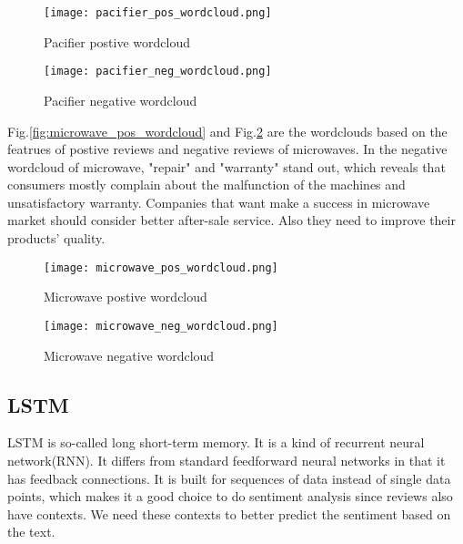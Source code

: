 \documentclass{mcmthesis}
\begin{document}
\begin{figure}[!h]
\centering
\begin{minipage}[t]{0.48\textwidth}
\centering
\texttt{[image: pacifier\_pos\_wordcloud.png]}
\caption{Pacifier postive wordcloud}
\label{fig:pacifier_pos_wordcloud}
\end{minipage}
\begin{minipage}[t]{0.48\textwidth}
\centering
\texttt{[image: pacifier\_neg\_wordcloud.png]}
\caption{Pacifier negative wordcloud}
\label{fig:pacifier_neg_wordcloud}
\end{minipage}
\end{figure}



Fig.\ref{fig:microwave_pos_wordcloud} and Fig.\ref{fig:microwave_neg_wordcloud} are the wordclouds based on the featrues of postive reviews and negative reviews of microwaves. In the negative wordcloud of microwave, "repair" and "warranty" stand out, which reveals that consumers mostly complain about the malfunction of the machines and unsatisfactory warranty. Companies that want make a success in microwave market should consider better after-sale service. Also they need to improve their products' quality.

\begin{figure}[!h]
\centering
\begin{minipage}[t]{0.48\textwidth}
\centering
\texttt{[image: microwave\_pos\_wordcloud.png]}
\caption{Microwave postive wordcloud}
\label{fig:microwave_pos_wordcloud}
\end{minipage}
\begin{minipage}[t]{0.48\textwidth}
\centering
\texttt{[image: microwave\_neg\_wordcloud.png]}
\caption{Microwave negative wordcloud}
\label{fig:microwave_neg_wordcloud}
\end{minipage}
\end{figure}





\subsection{LSTM}

LSTM is so-called long short-term memory. It is a kind of recurrent neural network(RNN). It differs from standard feedforward neural networks in that it has feedback connections. It is built for sequences of data instead of single data points, which makes it a good choice to do sentiment analysis since reviews also have contexts. We need these contexts to better predict the sentiment based on the text.
\end{document}
